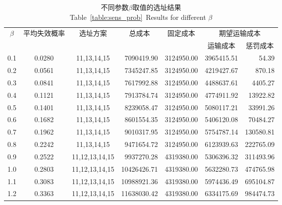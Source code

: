 \begin{table}[htbp]
    \setlength{\abovecaptionskip}{-0.05cm} %
    \setlength{\belowcaptionskip}{-0.2cm} 
    \centering
    \renewcommand\arraystretch{0.9}
    \caption{不同参数$\beta$取值的选址结果\\Table~\ref{table:sens_prob}~Results for different $\beta$}
    \small
    \begin{tabular}{cccrccr}
        \toprule %
        \multicolumn{1}{c}{\multirow{2}[0]{*}{$\beta$}} & \multicolumn{1}{c}{\multirow{2}[0]{*}{平均失效概率}} & \multirow{2}[0]{*}{选址方案} & \multicolumn{1}{c}{\multirow{2}[0]{*}{总成本}} & \multicolumn{1}{c}{\multirow{2}[0]{*}{固定成本}} & \multicolumn{2}{c}{期望运输成本} \\
        \cmidrule{6-7}
        &       &       &       &       & \multicolumn{1}{c}{运输成本} & \multicolumn{1}{c}{惩罚成本} \\
        \midrule
        0.1   & 0.0280 & 11,13,14,15 & 7090419.90 & 3124950.00 & 3965415.51  & 54.39  \\
        0.2   & 0.0561 & 11,13,14,15 & 7345247.85 & 3124950.00 & 4219427.67  & 870.18  \\
        0.3   & 0.0841 & 11,13,14,15 & 7617992.88 & 3124950.00 & 4488637.61  & 4405.27  \\
        0.4   & 0.1121 & 11,13,14,15 & 7913784.74 & 3124950.00 & 4774911.92  & 13922.82  \\
        0.5   & 0.1401 & 11,13,14,15 & 8239058.47 & 3124950.00 & 5080117.21  & 33991.26  \\
        0.6   & 0.1682 & 11,13,14,15 & 8601554.35 & 3124950.00 & 5406120.08  & 70484.27  \\
        0.7   & 0.1962 & 11,13,14,15 & 9010317.95 & 3124950.00 & 5754787.14  & 130580.81  \\
        0.8   & 0.2242 & 11,13,14,15 & 9471654.72 & 3124950.00 & 6123939.63  & 222765.09  \\
        0.9   & 0.2522 & 11,12,13,14,15 & 9937270.28 & 4319380.00 & 5306396.32  & 311493.96  \\
        1.0   & 0.2803 & 11,12,13,14,15 & 10426426.71 & 4319380.00 & 5632280.73  & 474765.98  \\
        1.1   & 0.3083 & 11,12,13,14,15 & 10988921.36 & 4319380.00 & 5974436.49  & 695104.87  \\
        1.2   & 0.3363 & 11,12,13,14,15 & 11638030.42 & 4319380.00 & 6334175.69  & 984474.73  \\

\end{tabular}
\end{table}
